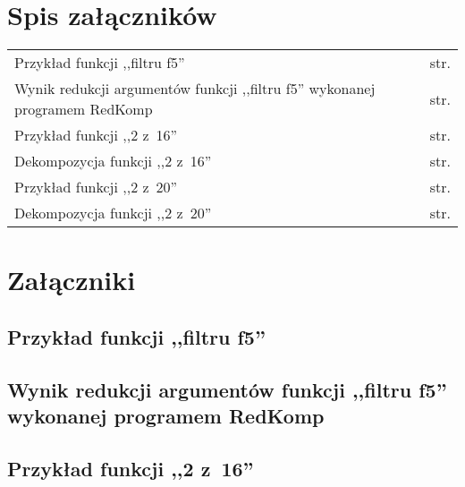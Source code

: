 \chapter*{Spis załączników}
\noindent

\begin{tabularx}{\textwidth}{Xl}

Przykład funkcji ,,filtru f5'' & str. \pageref{file:f5.pla} \\
Wynik redukcji argumentów funkcji ,,filtru f5'' wykonanej programem RedKomp & str. \pageref{file:f5.txt} \\

Przykład funkcji ,,2 z~16'' & str. \pageref{file:2outof16.pla} \\
Dekompozycja funkcji ,,2 z~16'' & str. \pageref{file:2outof16.txt} \\

Przykład funkcji ,,2 z~20'' & str. \pageref{file:2outof20.pla} \\
Dekompozycja funkcji ,,2 z~20'' & str. \pageref{file:2outof20.txt} \\
\end{tabularx}

\chapter*{Załączniki}
\section*{Przykład funkcji ,,filtru f5''}
\label{file:f5.pla}

\clearpage
\section*{Wynik redukcji argumentów funkcji ,,filtru f5'' wykonanej programem RedKomp}
\label{file:f5.txt}

\clearpage

\section*{Przykład funkcji ,,2 z~16''}
\label{file:2outof16.pla}

\clearpage

